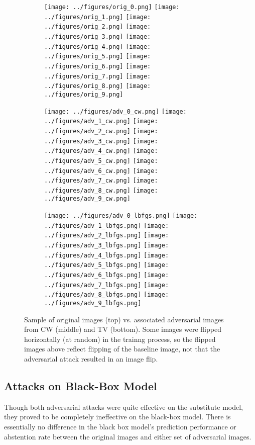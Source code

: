 \documentclass{article}
\begin{document}
\begin{figure}[H]
    \centering
    \begin{subfigure}{\linewidth}
        \texttt{[image: ../figures/orig\_0.png]}
        \texttt{[image: ../figures/orig\_1.png]}
        \texttt{[image: ../figures/orig\_2.png]}
        \texttt{[image: ../figures/orig\_3.png]}
        \texttt{[image: ../figures/orig\_4.png]}
        \texttt{[image: ../figures/orig\_5.png]}
        \texttt{[image: ../figures/orig\_6.png]}
        \texttt{[image: ../figures/orig\_7.png]}
        \texttt{[image: ../figures/orig\_8.png]}
        \texttt{[image: ../figures/orig\_9.png]}
    \end{subfigure} \par\medskip
    \begin{subfigure}{\linewidth}
        \texttt{[image: ../figures/adv\_0\_cw.png]}
        \texttt{[image: ../figures/adv\_1\_cw.png]}
        \texttt{[image: ../figures/adv\_2\_cw.png]}
        \texttt{[image: ../figures/adv\_3\_cw.png]}
        \texttt{[image: ../figures/adv\_4\_cw.png]}
        \texttt{[image: ../figures/adv\_5\_cw.png]}
        \texttt{[image: ../figures/adv\_6\_cw.png]}
        \texttt{[image: ../figures/adv\_7\_cw.png]}
        \texttt{[image: ../figures/adv\_8\_cw.png]}
        \texttt{[image: ../figures/adv\_9\_cw.png]}
    \end{subfigure} \par\medskip
    \begin{subfigure}{\linewidth}
        \texttt{[image: ../figures/adv\_0\_lbfgs.png]}
        \texttt{[image: ../figures/adv\_1\_lbfgs.png]}
        \texttt{[image: ../figures/adv\_2\_lbfgs.png]}
        \texttt{[image: ../figures/adv\_3\_lbfgs.png]}
        \texttt{[image: ../figures/adv\_4\_lbfgs.png]}
        \texttt{[image: ../figures/adv\_5\_lbfgs.png]}
        \texttt{[image: ../figures/adv\_6\_lbfgs.png]}
        \texttt{[image: ../figures/adv\_7\_lbfgs.png]}
        \texttt{[image: ../figures/adv\_8\_lbfgs.png]}
        \texttt{[image: ../figures/adv\_9\_lbfgs.png]}
    \end{subfigure}
    \caption{Sample of original images (top) vs. associated adversarial images from CW (middle) and TV (bottom). Some images were flipped horizontally (at random) in the trainng process, so the flipped images above reflect flipping of the baseline image, not that the adversarial attack resulted in an image flip.}
    \label{fig:orig_adv_image_comparison}
\end{figure}

\subsection{Attacks on Black-Box Model}
Though both adversarial attacks were quite effective on the substitute model, they proved to be completely ineffective on the black-box model. There is essentially no difference in the black box model's prediction performance or abstention rate between the original images and either set of adversarial images.
\end{document}
